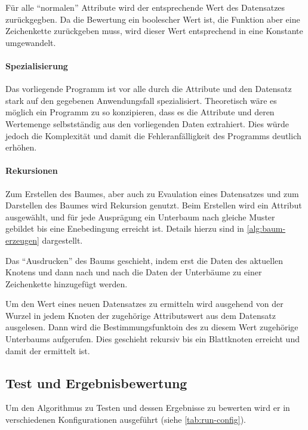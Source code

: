 

Für alle \enquote{normalen} Attribute wird der entsprechende Wert des Datensatzes zurückgegben.
Da die Bewertung ein boolescher Wert ist, die Funktion aber eine Zeichenkette zurückgeben muss,
wird dieser Wert entsprechend in eine Konstante umgewandelt.

\paragraph{Spezialisierung}
Das vorliegende Programm ist vor alle durch die Attribute und den Datensatz stark auf den gegebenen Anwendungsfall spezialisiert.
Theoretisch wäre es möglich ein Programm zu so konzipieren, dass es die Attribute und deren Wertemenge selbstständig aus den vorliegenden Daten extrahiert.
Dies würde jedoch die Komplexität und damit die Fehleranfälligkeit des Programms deutlich erhöhen.

\paragraph{Rekursionen}
Zum Erstellen des Baumes, aber auch zu Evaulation eines Datensatzes und zum Darstellen des Baumes wird Rekursion genutzt.
Beim Erstellen wird ein Attribut ausgewählt, und für jede Ausprägung ein Unterbaum nach gleiche Muster gebildet bis eine Enebedingung erreicht ist.
Details hierzu sind in \autoref{alg:baum-erzeugen} dargestellt.

Das \enquote{Ausdrucken} des Baums geschieht,
indem erst die Daten des aktuellen Knotens und
dann nach und nach die Daten der Unterbäume zu einer Zeichenkette hinzugefügt werden.

Um den Wert eines neuen Datensatzes zu ermitteln wird ausgehend von der Wurzel in jedem Knoten der zugehörige Attributswert aus dem Datensatz ausgelesen.
Dann wird die Bestimmungsfunktoin des zu diesem Wert zugehörige Unterbaums aufgerufen.
Dies geschieht rekursiv bis ein Blattknoten erreicht und damit der ermittelt ist.

\subsection{Test und Ergebnisbewertung}
Um den Algorithmus zu Testen und dessen Ergebnisse zu bewerten wird er in verschiedenen Konfigurationen ausgeführt (siehe \autoref{tab:run-config}).


